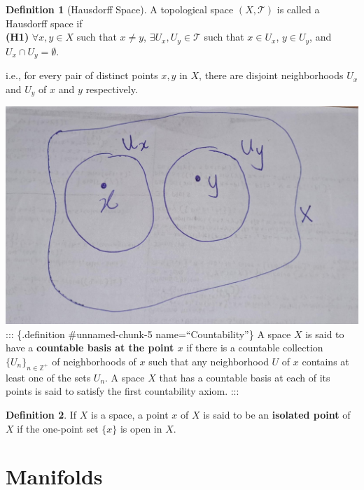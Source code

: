 \documentclass[
]{book}
\theoremstyle{definition}
\newtheorem{definition}{Definition}[chapter]
\theoremstyle{definition}
\theoremstyle{definition}
\theoremstyle{definition}
\theoremstyle{remark}
\begin{document}
\begin{definition}[Hausdorff Space]
\protect\hypertarget{def:unnamed-chunk-4}{}\label{def:unnamed-chunk-4}A topological space \((X,\mathcal{T})\) is called a Hausdorff space if\\
\textbf{(H1)} \(\forall x,y \in X\) such that \(x \neq y\), \(\exists U_x, U_y \in \mathcal{T}\) such that \(x \in U_x\), \(y \in U_y\), and \(U_x \cap U_y = \emptyset\).

i.e., for every pair of distinct points \(x, y\) in \(X\), there are disjoint neighborhoods \(U_x\) and \(U_y\) of \(x\) and \(y\) respectively.
\end{definition}

\includegraphics{figures/ch1/fig01.jpg}
::: \{.definition \#unnamed-chunk-5 name=``Countability''\}
A space \(X\) is said to have a \textbf{countable basis at the point \(x\)} if there is a countable collection \(\{U_n\}_{n\in\mathbb{Z}^+}\) of neighborhoods of \(x\) such that any neighborhood \(U\) of \(x\) contains at least one of the sets \(U_n\). A space \(X\) that has a countable basis at each of its points is said to satisfy the first countability axiom.
:::

\begin{definition}
\protect\hypertarget{def:unnamed-chunk-6}{}\label{def:unnamed-chunk-6}If \(X\) is a space, a point \(x\) of \(X\) is said to be an \textbf{isolated point} of \(X\) if the one-point set \(\{x\}\) is open in \(X\).
\end{definition}

\hypertarget{manifolds}{%
\chapter{Manifolds}\label{manifolds}}
\end{document}
